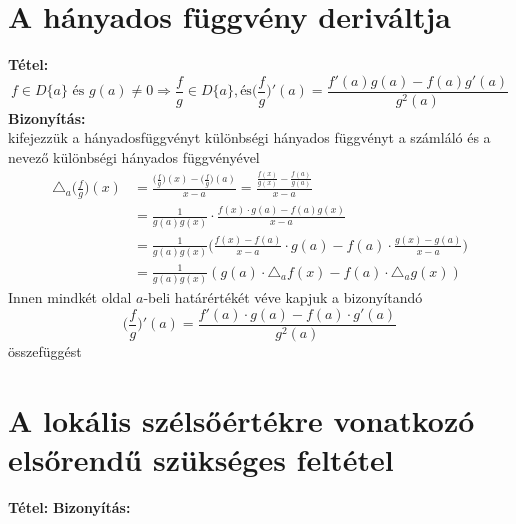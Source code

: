 \documentclass[10pt,a4paper]{article}
\newcommand{\f}[1][x]{f(#1)}
\newcommand{\g}[1][x]{g(#1)}
\newcommand{\fg}{\Big(\frac{f}{g}\Big)}
\begin{document}
\section{A hányados függvény deriváltja}
\textbf{Tétel:}
\[
f\in D\{a\} \text{ és }  g(a)\neq 0 \Longrightarrow  \frac{f}{g} \in D\{a\},  \text{és}  \Big(\frac{f}{g} \Big)' (a) = \frac{f'(a)g(a)-f(a)g'(a)}{g^2(a)}
\]
\textbf{Bizonyítás:} \\
kifejezzük a hányadosfüggvényt különbségi hányados függvényt a számláló és a nevező különbségi hányados függvényével 
\begin{align*}
\triangle_a\fg (x) &= \frac{\fg (x)-\fg (a)}{x-a} = \frac{\frac{\f}{\g}-\frac{\f[a]}{\g[a]}}{x-a}  \\
&=\frac{1}{\g[a]\g} \cdot \frac{\f\cdot\g[a] - \f[a]\g}{x-a} \\ 
&=\frac{1}{\g[a]\g} \Big(\frac{\f -\f[a]}{x-a} \cdot\g[a] -\f[a]\cdot\frac{\g -\g[a]}{x-a} \Big) \\
&=\frac{1}{\g[a]\g} (\g[a]\cdot\triangle_a \f -\f[a]\cdot\triangle_a \g )
\end{align*}
Innen mindkét oldal $a$-beli határértékét véve kapjuk a bizonyítandó 
\[
\fg '(a) = \frac{f'(a)\cdot\g[a] - \f[a]\cdot g'(a)}{g^2 (a)}
\]
összefüggést
\newpage
\section{A lokális szélsőértékre vonatkozó elsőrendű szükséges feltétel}
\textbf{Tétel:}
\textbf{Bizonyítás:}
\end{document}
